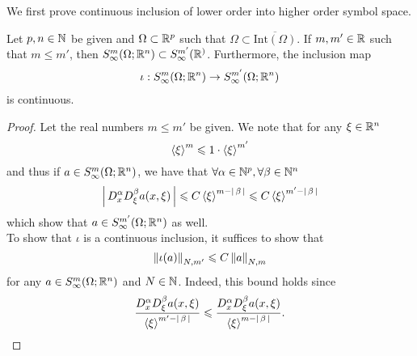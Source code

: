 \documentclass[12pt]{article}
\begin{document}
We first prove continuous inclusion of lower order into higher order symbol space. 
\begin{fprop}
    Let $p, n \in \N$ be given and $\Omega \subset \R^p$ such that $\Omega \subset \overline{\mathrm{Int}(\Omega)}$. If $m, m' \in \R$ such that $m \leq m'$, then $S^m_\infty(\Omega; \R^n) \subset S^{m'}_\infty(\R^)$. Furthermore, the inclusion map 
    \begin{align*}
        \iota: S^m_\infty(\Omega; \R^n) \to S^{m'}_\infty(\Omega; \R^n)
    \end{align*}
    is continuous. 
\end{fprop}
\begin{proof}
    Let the real numbers $m \leq m'$ be given. We note that for any $\xi \in \R^n$
    \[
    \sym[\xi]^m \leq 1 \cdot \sym[\xi]^{m'}
    \]
    and thus if $a \in S^{m}_\infty(\Omega; \R^n)$, we have that $\forall \alpha \in \N^p, \forall \beta \in \N^n$
    \[
    \abs{D^\alpha_x D^\beta_\xi a(x, \xi)} \leq C \sym[\xi]^{m - \abs{\beta}} \leq C \sym[\xi]^{m' - \abs{\beta}} 
    \]
    which show that $a \in S^{m'}_\infty(\Omega; \R^n)$ as well. \\
    
    To show that $\iota$ is a continuous inclusion, it suffices to show that 
    \[
    \norm[\iota(a)]_{N, m'} \leq C \norm[a]_{N, m}
    \]
    for any $a \in S^{m}_\infty(\Omega; \R^n)$ and $N \in \N$. Indeed, this bound holds since 
    \[
    \frac{D^\alpha_x D^\beta_\xi a(x, \xi)}{\sym[\xi]^{m' - \abs{\beta}}}  \leq \frac{D^\alpha_x D^\beta_\xi a(x, \xi)}{\sym[\xi]^{m - \abs{\beta}}}. 
    \]
\end{proof}
\hfill \\ [3em]
\end{document}
